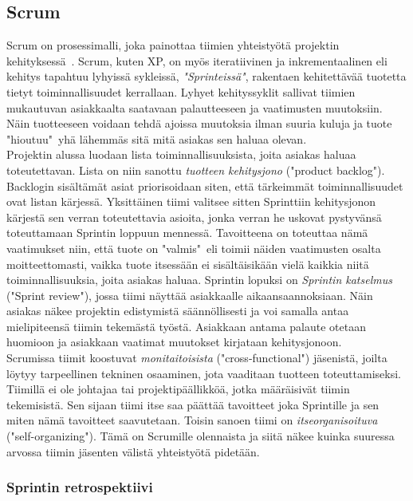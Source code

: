 \documentclass[finnish]{../tktltiki2}
\theoremstyle{definition}
\theoremstyle{remark}
\begin{document}
\subsection{Scrum}

Scrum on prosessimalli, joka painottaa tiimien yhteistyötä projektin kehityksessä~\cite{ScrumORG}. Scrum, kuten XP, on myös iteratiivinen ja inkrementaalinen
eli kehitys tapahtuu lyhyissä sykleissä, \emph{"Sprinteissä"}, rakentaen kehitettävää tuotetta tietyt toiminnallisuudet kerrallaan. Lyhyet kehityssyklit sallivat tiimien mukautuvan asiakkaalta saatavaan palautteeseen ja vaatimusten muutoksiin. Näin tuotteeseen voidaan tehdä ajoissa
muutoksia ilman suuria kuluja ja tuote "hioutuu"~yhä lähemmäs sitä mitä asiakas sen haluaa olevan.\\

Projektin alussa luodaan lista toiminnallisuuksista,
joita asiakas haluaa toteutettavan. Lista on niin sanottu \emph{tuotteen kehitysjono} ("product backlog"). Backlogin sisältämät asiat priorisoidaan siten, että tärkeimmät toiminnallisuudet ovat listan kärjessä. Yksittäinen tiimi valitsee sitten Sprinttiin kehitysjonon kärjestä sen verran
toteutettavia asioita, jonka verran he uskovat pystyvänsä toteuttamaan Sprintin loppuun mennessä. Tavoitteena on toteuttaa nämä vaatimukset niin,
että tuote on "valmis"~eli toimii näiden vaatimusten osalta moitteettomasti, vaikka tuote itsessään ei sisältäisikään vielä kaikkia niitä
toiminnallisuuksia, joita asiakas haluaa. Sprintin lopuksi on \emph{Sprintin katselmus} ("Sprint review"), jossa tiimi näyttää asiakkaalle
aikaansaannoksiaan. Näin asiakas näkee projektin edistymistä säännöllisesti ja voi samalla antaa mielipiteensä tiimin tekemästä työstä. Asiakkaan
antama palaute otetaan huomioon ja asiakkaan vaatimat muutokset kirjataan kehitysjonoon.\\

Scrumissa tiimit koostuvat \emph{monitaitoisista} ("cross-functional") jäsenistä, joilta löytyy tarpeellinen tekninen osaaminen, jota vaaditaan
tuotteen toteuttamiseksi. Tiimillä ei ole johtajaa tai projektipäällikköä, jotka määräisivät tiimin tekemisistä. Sen sijaan tiimi itse
saa päättää tavoitteet joka Sprintille ja sen miten nämä tavoitteet saavutetaan. Toisin sanoen tiimi on \emph{itseorganisoituva}
("self-organizing"). Tämä on Scrumille olennaista ja siitä näkee kuinka suuressa arvossa tiimin jäsenten välistä yhteistyötä pidetään.~\cite{ScrumHandBook}

\subsubsection{Sprintin retrospektiivi}
\end{document}
